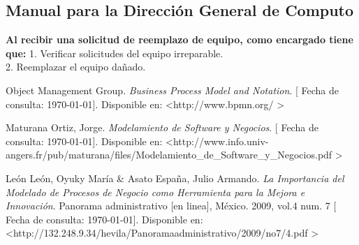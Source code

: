 \documentclass[spanish,12pt,letterpapper]{article}
\begin{document}
	\subsection{Manual para la Dirección General de Computo}
	\textbf{Al recibir una solicitud de reemplazo de equipo, como encargado tiene que:}
	1. Verificar solicitudes del equipo irreparable.\\
	2. Reemplazar el equipo dañado.\\
	
	\pagebreak
	\begin{thebibliography}{9}
	 Object Management Group. 
		\emph{Business Process Model and Notation}. {[} Fecha de consulta: \today {]}. Disponible en: \textless http://www.bpmn.org/ \textgreater	
	
		 Maturana Ortiz, Jorge. 
		\emph{Modelamiento de Software y Negocios}. {[} Fecha de consulta: \today {]}. Disponible en: \textless http://www.info.univ-angers.fr/pub/maturana/files/Modelamiento\_de\_Software\_y\_Negocios.pdf \textgreater
		
		 León León, Oyuky María \& Asato España, Julio Armando. 
		\emph{La Importancia del Modelado de Procesos de
			Negocio como Herramienta para la Mejora e
			Innovación}. Panorama administrativo {[}en linea{]}, México. 2009, vol.4 num. 7  {[} Fecha de consulta: \today {]}. Disponible en: \textless http://132.248.9.34/hevila/Panoramaadministrativo/2009/no7/4.pdf \textgreater
	\end{thebibliography}
\end{document}
